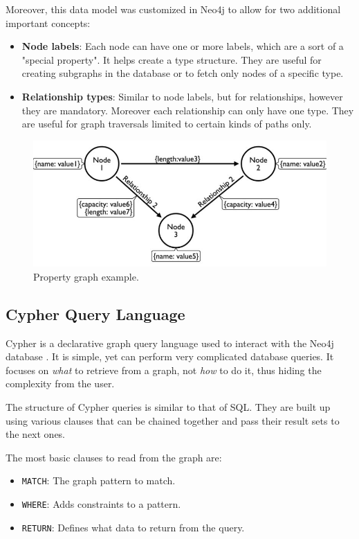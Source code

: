 \documentclass[12pt]{report}
\begin{document}
Moreover, this data model was customized in Neo4j to allow for two additional important concepts:
\begin{itemize}
\item {\bf Node labels}: Each node can have one or more labels, which are a sort of a "special property". It helps create a type structure. They are useful for creating subgraphs in the database or to fetch only nodes of a specific type.
\item {\bf Relationship types}: Similar to node labels, but for relationships, however they are mandatory. Moreover each relationship can only have one type. They are useful for graph traversals limited to certain kinds of paths only.
\end{itemize}

\begin{figure}[!t]
\centering
\includegraphics[width=\textwidth]{property_graph2.jpg} 
\caption[Property graph example.]{Property graph example.\footnotemark{}}
\label{fig.property_graph}
\end{figure}

\subsection{Cypher Query Language}

Cypher is a declarative graph query language used to interact with the Neo4j database \cite{neo4j}. It is simple, yet can perform very complicated database queries. It focuses on \textit{what} to retrieve from a graph, not \textit{how} to do it, thus hiding the complexity from the user.

The structure of Cypher queries is similar to that of SQL. They are built up using various clauses that can be chained together and pass their result sets to the next ones.

The most basic clauses to read from the graph are:
\begin{itemize}
\item \texttt{MATCH}: The graph pattern to match.
\item \texttt{WHERE}: Adds constraints to a pattern.
\item \texttt{RETURN}: Defines what data to return from the query.
\end{itemize}
\end{document}
